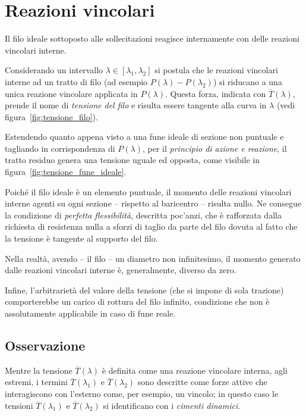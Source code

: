 \section*{Reazioni vincolari}
Il filo ideale sottoposto alle sollecitazioni reagisce internamente con delle reazioni vincolari interne.

Considerando un intervallo $\lambda\in[\lambda_1, \lambda_2]$ si postula che le reazioni vincolari interne ad un tratto di filo (ad esempio $P(\lambda) - P(\lambda_2)$) si riducano a una unica reazione vincolare applicata in $P(\lambda)$. Questa forza, indicata con $\overline{T}(\lambda)$, prende il nome di \emph{tensione del filo} e risulta essere tangente alla curva in $\lambda$ (vedi figura~\ref{fig:tensione_filo}).



Estendendo quanto appena visto a una fune ideale di sezione non puntuale e tagliando in corrispondenza di $P(\lambda)$, per il \emph{principio di azione e reazione}, il tratto residuo genera una tensione uguale ed opposta, come visibile in figura~\ref{fig:tensione_fune_ideale}.

Poiché il filo ideale è un elemento puntuale, il momento delle reazioni vincolari interne agenti su ogni sezione -- rispetto al baricentro -- risulta nullo. Ne consegue la condizione di \emph{perfetta flessibilità}, descritta poc'anzi, che è rafforzata dalla richiesta di  resistenza nulla a sforzi di taglio da parte del filo dovuta al fatto che la tensione è tangente al supporto del filo.

Nella realtà, avendo -- il filo -- un diametro non infinitesimo, il momento generato dalle reazioni vincolari interne è, generalmente, diverso da zero.

Infine, l'arbitrarietà del valore della tensione (che si impone di sola trazione) comporterebbe un carico di rottura del filo infinito, condizione che non è assolutamente applicabile in caso di fune reale.

\subsection*{Osservazione}
Mentre la tensione $\overline{T}(\lambda)$ è definita come una reazione vincolare interna, agli estremi, i termini $\overline{T}(\lambda_1)$ e $\overline{T}(\lambda_2)$ sono descritte come forze attive che interagiscono con l'esterno come, per esempio, un vincolo; in questo caso le tensioni $\overline{T}(\lambda_1)$ e $\overline{T}(\lambda_2)$ si identificano con i \emph{cimenti dinamici}.

